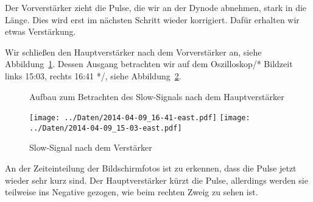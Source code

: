Der Vorverstärker zieht die Pulse, die wir an der Dynode abnehmen, stark in die
Länge. Dies wird erst im nächsten Schritt wieder korrigiert. Dafür erhalten wir
etwas Verstärkung.

Wir schließen den Hauptverstärker nach dem Vorverstärker an, siehe
Abbildung~\ref{fig:aufbau:slow_amp}. Dessen Ausgang betrachten wir auf dem
Oszilloskop/* Bildzeit links 15:03, rechts 16:41 */, siehe
Abbildung~\ref{fig:slow_amp}.

\begin{figure}[htbp]
    \centering
    \caption{%
        Aufbau zum Betrachten des Slow-Signals nach dem Hauptverstärker
    }
    \label{fig:aufbau:slow_amp}
\end{figure}

\begin{figure}[htbp]
    \centering
    \texttt{[image: ../Daten/2014-04-09\_16-41-east.pdf]}
    \hfill
    \texttt{[image: ../Daten/2014-04-09\_15-03-east.pdf]}
    \caption{%
        Slow-Signal nach dem Verstärker
    }
    \label{fig:slow_amp}
\end{figure}

An der Zeiteinteilung der Bildschirmfotos ist zu erkennen, dass die Pulse jetzt
wieder sehr kurz sind. Der Hauptverstärker kürzt die Pulse, allerdings werden
sie teilweise ins Negative gezogen, wie beim rechten Zweig zu sehen ist.

